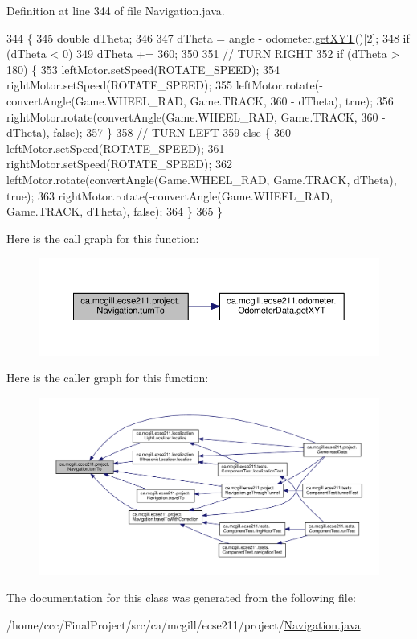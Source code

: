 Definition at line 344 of file Navigation.\+java.


\begin{DoxyCode}
344                                                 \{
345     \textcolor{keywordtype}{double} dTheta;
346 
347     dTheta = angle - odometer.\hyperlink{classca_1_1mcgill_1_1ecse211_1_1odometer_1_1_odometer_data_a8f40f0264c68f0cbed4fff1723ae7863}{getXYT}()[2];
348     \textcolor{keywordflow}{if} (dTheta < 0)
349       dTheta += 360;
350 
351     \textcolor{comment}{// TURN RIGHT}
352     \textcolor{keywordflow}{if} (dTheta > 180) \{
353       leftMotor.setSpeed(ROTATE\_SPEED);
354       rightMotor.setSpeed(ROTATE\_SPEED);
355       leftMotor.rotate(-convertAngle(Game.WHEEL\_RAD, Game.TRACK, 360 - dTheta), \textcolor{keyword}{true});
356       rightMotor.rotate(convertAngle(Game.WHEEL\_RAD, Game.TRACK, 360 - dTheta), \textcolor{keyword}{false});
357     \}
358     \textcolor{comment}{// TURN LEFT}
359     \textcolor{keywordflow}{else} \{
360       leftMotor.setSpeed(ROTATE\_SPEED);
361       rightMotor.setSpeed(ROTATE\_SPEED);
362       leftMotor.rotate(convertAngle(Game.WHEEL\_RAD, Game.TRACK, dTheta), \textcolor{keyword}{true});
363       rightMotor.rotate(-convertAngle(Game.WHEEL\_RAD, Game.TRACK, dTheta), \textcolor{keyword}{false});
364     \}
365   \}
\end{DoxyCode}
Here is the call graph for this function\+:\nopagebreak
\begin{figure}[H]
\begin{center}
\leavevmode
\includegraphics[width=350pt]{classca_1_1mcgill_1_1ecse211_1_1project_1_1_navigation_a3bbe0645f2b3b3d0986b4a707fb5a00c_cgraph}
\end{center}
\end{figure}
Here is the caller graph for this function\+:\nopagebreak
\begin{figure}[H]
\begin{center}
\leavevmode
\includegraphics[width=350pt]{classca_1_1mcgill_1_1ecse211_1_1project_1_1_navigation_a3bbe0645f2b3b3d0986b4a707fb5a00c_icgraph}
\end{center}
\end{figure}


The documentation for this class was generated from the following file\+:\begin{DoxyCompactItemize}
\item 
/home/ccc/\+Final\+Project/src/ca/mcgill/ecse211/project/\hyperlink{_navigation_8java}{Navigation.\+java}\end{DoxyCompactItemize}
